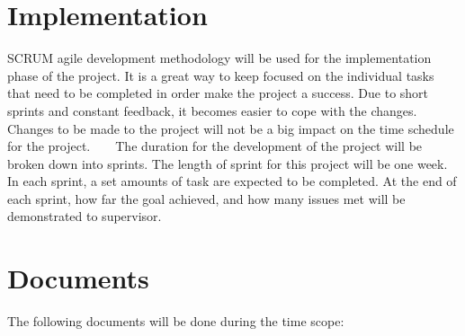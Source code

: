 \hypertarget{_project_plan_ProjectPlanImplementation}{}\section{Implementation}\label{_project_plan_ProjectPlanImplementation}
S\+C\+R\+U\+M agile development methodology will be used for the implementation phase of the project. It is a great way to keep focused on the individual tasks that need to be completed in order make the project a success. Due to short sprints and constant feedback, it becomes easier to cope with the changes. Changes to be made to the project will not be a big impact on the time schedule for the project. ~\newline
~\newline
The duration for the development of the project will be broken down into sprints. The length of sprint for this project will be one week. In each sprint, a set amounts of task are expected to be completed. At the end of each sprint, how far the goal achieved, and how many issues met will be demonstrated to supervisor. \hypertarget{_project_plan_ProjectPlanDocuments}{}\section{Documents}\label{_project_plan_ProjectPlanDocuments}
The following documents will be done during the time scope\+:
